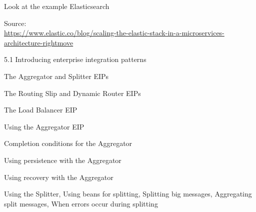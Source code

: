 \documentclass[Screen16to9,17pt]{foils}
\begin{document}

Look at the example Elasticsearch

Source:\\
{\footnotesize\url{https://www.elastic.co/blog/scaling-the-elastic-stack-in-a-microservices-architecture-rightmove}}








\begin{list2}
\item 5.1 Introducing enterprise integration patterns
\item The Aggregator and Splitter EIPs
\item The Routing Slip and Dynamic Router EIPs
\item The Load Balancer EIP
\end{list2}



\begin{list2}
\item Using the Aggregator EIP
\item Completion conditions for the Aggregator
\item Using persistence with the Aggregator
\item Using recovery with the Aggregator
\end{list2}











\begin{list2}
\item Using the Splitter, Using beans for splitting,
Splitting big messages, Aggregating split messages,
When errors occur during splitting
\end{list2}
\end{document}
